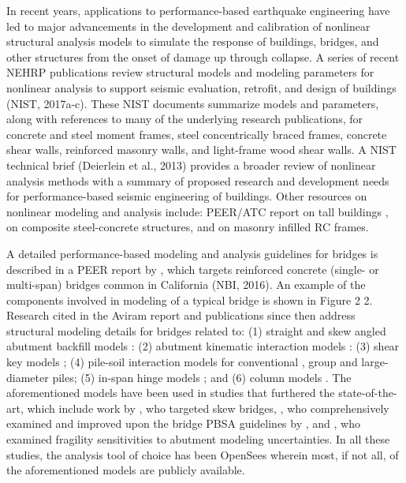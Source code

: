 In recent years, applications to performance-based earthquake engineering have led to major advancements in the development and calibration of nonlinear structural analysis models to simulate the response of buildings, bridges, and other structures from the onset of damage up through collapse. A series of recent NEHRP publications review structural models and modeling parameters for nonlinear analysis to support seismic evaluation, retrofit, and design of buildings (NIST, 2017a-c). These NIST documents summarize models and parameters, along with references to many of the underlying research publications, for concrete and steel moment frames, steel concentrically braced frames, concrete shear walls, reinforced masonry walls, and light-frame wood shear walls. A NIST technical brief (Deierlein et al., 2013) provides a broader review of nonlinear analysis methods with a summary of proposed research and development needs for performance-based seismic engineering of buildings. Other resources on nonlinear modeling and analysis include: PEER/ATC report on tall buildings \citep{malley2010modeling}, \cite{spacone2004nonlinear} on composite steel-concrete structures, and \cite{nurbaiah2017modelling} on masonry infilled RC frames.

A detailed performance-based modeling and analysis guidelines for bridges is described in a PEER report by \cite{aviram2008guidelines}, which targets reinforced concrete (single- or multi-span) bridges common in California (NBI, 2016). An example of the components involved in modeling of a typical bridge is shown in Figure 2 2. Research cited in the Aviram report and publications since then address structural modeling details for bridges related to: (1) straight and skew angled abutment backfill models \citep{shamsabadi2010validated}: (2) abutment kinematic interaction models \citep{zhang2002kinematic}: (3) shear key models \citep[e.g.][]{silva2009seismic}; (4) pile-soil interaction models for conventional \citep{hutchinson2001inelastic, taciroglu2006robust}, group \citep{lemnitzer2010nonlinear} and large-diameter \citep{khalili-tehrani2014nonlinear} piles; (5) in-span hinge models \citep{hube2008experimental}; and (6) column models \citep{terzic2015concrete, xu2011hysteretic}. The aforementioned models have been used in studies that furthered the state-of-the-art, which include work by \cite{kaviani2014performancebased}, who targeted skew bridges, \cite{omrani2015guidelines}, who comprehensively examined and improved upon the bridge PBSA guidelines by \cite{aviram2008guidelines}, and \cite{omrani2017variability}, who examined fragility sensitivities to abutment modeling uncertainties. In all these studies, the analysis tool of choice has been OpenSees \citep{mckenna2011opensees} wherein most, if not all, of the aforementioned models are publicly available. 

